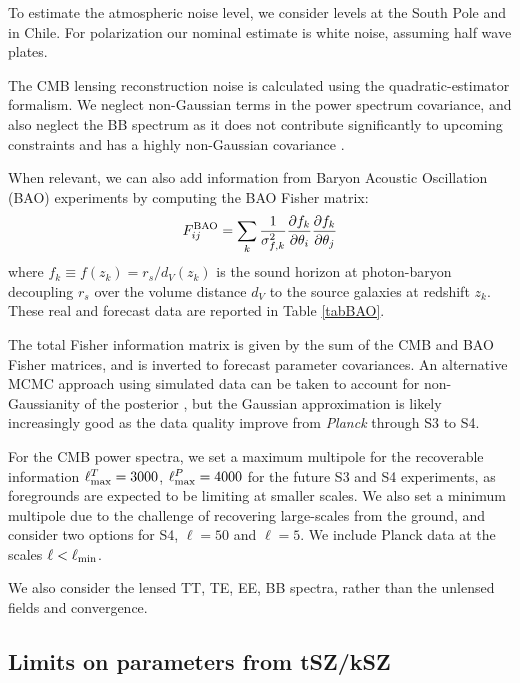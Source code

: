 To estimate the atmospheric noise level, we consider levels at the South Pole and in Chile.
For polarization our nominal estimate is white noise, assuming half wave plates.

%
The CMB lensing reconstruction noise is calculated using the \cite{Hu:2002} quadratic-estimator formalism. We neglect non-Gaussian terms in the power spectrum covariance, and also neglect the BB spectrum as it does not contribute significantly to upcoming constraints and has a highly non-Gaussian covariance \cite{Benoit-Levy:2012}. 

When relevant, we can also add information from Baryon Acoustic Oscillation (BAO) experiments by computing the BAO Fisher matrix:
%
\begin{equation}
F_{ij}^{\rm BAO} = \sum_{k} \frac{1}{\sigma_{f,k}^2}\frac{\partial f_k}{\partial \theta_i}\frac{\partial f_k}{\partial \theta_j}
\end{equation}
%
where $f_k \equiv f(z_k) = r_s/d_V(z_k)$ is the sound horizon at photon-baryon decoupling $r_s$ over the volume distance $d_V$ to the source galaxies at redshift $z_k$. These real and forecast data are reported in Table \ref{tabBAO}.

The total Fisher information matrix is given by the sum of the CMB and BAO Fisher matrices, and is inverted to forecast parameter covariances.  An alternative MCMC approach using simulated data can be taken to account for non-Gaussianity of the posterior \cite[e.g.,][]{Hall:2012}, but the Gaussian approximation is likely increasingly good as the data quality improve from {\sl Planck} through S3 to S4. 

For the CMB power spectra, we set a maximum multipole for the recoverable information $\ell^T_{\rm max} = 3000$, $\ell^P_{\rm max} = 4000$ for the future S3 and S4 experiments, as foregrounds are expected to be limiting at smaller scales. We also set a minimum multipole due to the challenge of recovering large-scales from the ground, and consider two options for S4, $\ell=50$ and $\ell=5$. We include Planck data at the scales $\ell<\ell_{\rm min}$. 

We also consider the lensed TT, TE, EE, BB spectra, rather than the unlensed fields and convergence.




\subsection{Limits on parameters from tSZ/kSZ}
